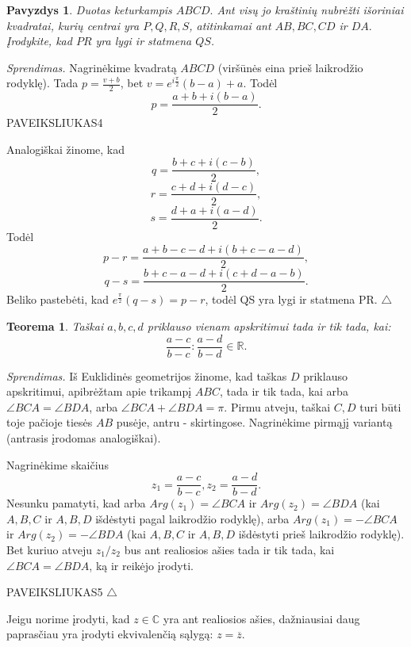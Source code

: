 \documentclass[11pt,a4paper,twoside]{book}
\newenvironment{sprendimas}{\noindent \textit{Sprendimas.}}{\hfill $\triangle$}
\newcounter{foo}[subsection]
\newtheorem{thmnr}{Teorema}
\newtheorem{pavnr}[foo]{Pavyzdys}
\theoremstyle{definition} \newtheorem*{api}{Apibrėžimas}
\theoremstyle{remark} \newtheorem*{pastaba}{Pastaba}
\begin{document}
\begin{pavnr}
Duotas keturkampis $ABCD.$ Ant visų jo kraštinių nubrėžti išoriniai kvadratai, kurių centrai yra $P, Q, R, S$, atitinkamai ant $AB, BC, CD$ ir $DA.$ Įrodykite, kad $PR$ yra lygi ir statmena $QS$. 
\end{pavnr}
\begin{sprendimas}
Nagrinėkime kvadratą $ABCD$ (viršūnės eina prieš laikrodžio rodyklę). Tada $p=\frac{v+b}{2}$, bet $v=e^{i\frac{\pi}{2}}(b-a)+a$. Todėl $$p=\frac{a+b+i(b-a)}{2}.$$
PAVEIKSLIUKAS4

Analogiškai žinome, kad $$q=\frac{b+c+i(c-b)}{2},$$ $$r=\frac{c+d+i(d-c)}{2},$$ $$s=\frac{d+a+i(a-d)}{2}.$$
Todėl $$p-r=\frac{a+b-c-d+i(b+c-a-d)}{2},$$ $$q-s=\frac{b+c-a-d+i(c+d-a-b)}{2}.$$
Beliko pastebėti, kad $e^{\frac{\pi}{2}}(q-s)=p-r$, todėl QS yra lygi ir statmena PR.
\end{sprendimas}





\begin{thmnr}
Taškai $a, b, c, d$ priklauso vienam apskritimui tada ir tik tada, kai: 
$$\frac{a - c}{b - c}:\frac{a-d}{b-d}\in\mathbb{R}.$$
\end{thmnr}
\begin{sprendimas}
Iš Euklidinės geometrijos žinome, kad taškas $D$ priklauso apskritimui, apibrėžtam apie trikampį $ABC$, tada ir tik tada, kai arba $\angle BCA=\angle BDA$, arba $\angle BCA+\angle BDA=\pi $. Pirmu atveju, taškai $C, D$ turi būti toje pačioje tiesės $AB$ pusėje, antru - skirtingose. Nagrinėkime pirmąjį variantą (antrasis įrodomas analogiškai). 

Nagrinėkime skaičius $$z_1 =\frac{a - c}{b - c}, z_2 =\frac{a - d}{b - d}.$$ 
Nesunku pamatyti, kad arba $Arg (z_1) = \angle BCA$ ir $Arg (z_2) = \angle BDA$ (kai $A, B, C$ ir $A, B, D$ išdėstyti pagal laikrodžio rodyklę), arba $Arg (z_1) = -\angle BCA$ ir $Arg (z_2) =- \angle BDA$  (kai $A, B, C$ ir $A, B, D$ išdėstyti prieš laikrodžio rodyklę). Bet kuriuo atveju $z_1/z_2$ bus ant realiosios ašies tada ir tik tada, kai $\angle BCA=\angle BDA$, ką ir reikėjo įrodyti.

PAVEIKSLIUKAS5
\end{sprendimas}

Jeigu norime įrodyti, kad $z \in \mathbb{C}$ yra ant realiosios ašies, dažniausiai daug paprasčiau yra įrodyti ekvivalenčią sąlygą: $z=\overline{z}$.
\end{document}
